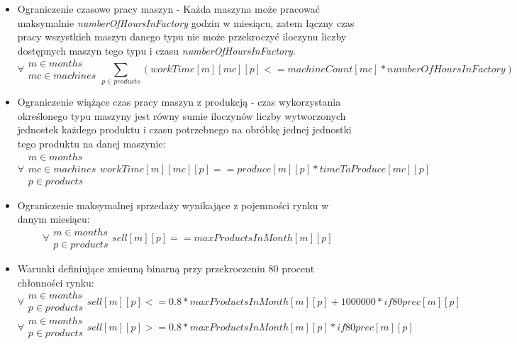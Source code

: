 \begin{itemize}
\item Ograniczenie czasowe pracy maszyn - Każda maszyna może pracować maksymalnie \textit{numberOfHoursInFactory} godzin w miesiącu, zatem łączny czas pracy wszystkich maszyn danego typu nie może przekroczyć iloczynu liczby dostępnych maszyn tego typu i czasu \textit{numberOfHoursInFactory}.
	\begin{equation}
		\forall{\substack{
			m \in months\\ 
			mc \in machines}}  \sum_{p \in products}
		(workTime[m][mc][p] <= machineCount[mc]*numberOfHoursInFactory)
	\end{equation}
    \item Ograniczenie wiążące czas pracy maszyn z produkcją - czas wykorzystania określonego typu maszyny jest równy sumie iloczynów liczby wytworzonych jednostek każdego produktu i czasu potrzebnego na obróbkę jednej jednostki tego produktu na danej maszynie:
	\begin{equation}
		\forall{\substack{
			m \in months\\ 
			mc \in machines\\
			p \in products}} workTime[m][mc][p] == produce[m][p]*timeToProduce[mc][p]
	\end{equation}
    \item Ograniczenie maksymalnej sprzedaży wynikające z pojemności rynku w danym miesiącu:
	\begin{equation}
		\forall{\substack{
			m \in months\\ 
			p \in products}} sell[m][p] == maxProductsInMonth[m][p]
	\end{equation}
	
    \item Warunki definiujące zmienną binarną przy przekroczeniu 80 procent chłonności rynku:
	\begin{equation}
		\forall{\substack{
			m \in months\\ 
			p \in products}}  sell[m][p] <= 0.8*maxProductsInMonth[m][p] + 1000000 * if80prec[m][p]
	\end{equation}
	\begin{equation}
		\forall{\substack{
			m \in months\\ 
			p \in products}} sell[m][p] >= 0.8*maxProductsInMonth[m][p] * if80prec[m][p]
	\end{equation}
	

\end{itemize}
